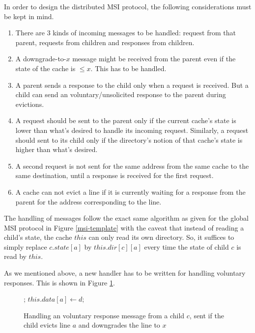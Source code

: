 In order to design the distributed MSI protocol, the following considerations
must be kept in mind.
\begin{enumerate}
\item There are 3 kinds of incoming messages to be handled: request from that parent,
requests from children and responses from children.
\item A downgrade-to-$x$ message might be received from the parent even if the
state of the cache is $ \le x$. This has to be handled.
\item A parent sends a response to the child only when a request is received. But a child can send an voluntary/unsolicited response to the parent during evictions.
\item A request should be sent to the parent only if the current cache's state
is lower than what's desired to handle its incoming request. Similarly, a
request should sent to its child only if the directory's notion of that cache's
state is higher than what's desired.
\item A second request is not sent for the same address from the same cache to the same
destination, until a response is received for the first request.
\item A cache can not evict a line if it is currently waiting for a response from the parent for the address corresponding to the line.
\end{enumerate}


The handling of messages follow the exact same algorithm as given for the
global MSI protocol in Figure \ref{msi-template} with the caveat that instead
of reading a child's state, the cache $this$ can only read its own directory.
So, it suffices to simply replace $c.state[a]$ by $this.dir[c][a]$ every time
the state of child $c$ is read by $this$.

As we mentioned above, a new handler has to be written for handling voluntary
responses. This is shown in Figure \ref{msi-unsolicited}.

\begin{figure}
\small
\begin{algorithmic}
    \State \receive{} ;
    \State $this.data[a] \gets d$;
  \EndIf
\EndProc
\end{algorithmic}
\caption{Handling an voluntary response message from a child $c$, sent if the
child evicts line $a$ and downgrades the line to $x$}
\label{msi-unsolicited}
\end{figure}

